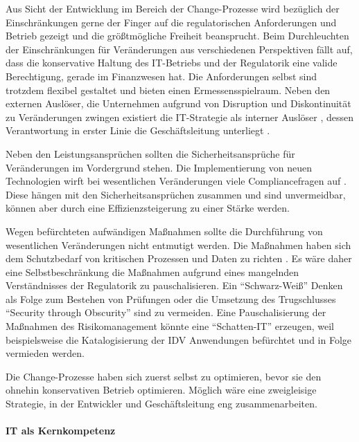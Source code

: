 Aus Sicht der Entwicklung im Bereich der Change-Prozesse wird bezüglich der Einschränkungen gerne der Finger auf die regulatorischen Anforderungen und Betrieb gezeigt und die größtmögliche Freiheit beansprucht. Beim Durchleuchten der Einschränkungen für Veränderungen aus verschiedenen Perspektiven fällt auf, dass die konservative Haltung des IT-Betriebs und der Regulatorik eine valide Berechtigung, gerade im Finanzwesen hat. Die Anforderungen selbst sind trotzdem flexibel gestaltet und bieten einen Ermessensspielraum. Neben den externen Auslöser, die Unternehmen aufgrund von Disruption und Diskontinuität zu Veränderungen zwingen \cite{Gupta:2017, Fernandez:2020} existiert die IT-Strategie als interner Auslöser \cite{BAIT:2018, Alt2017}, dessen Verantwortung in erster Linie die Geschäftsleitung unterliegt \cite{BAIT:2018}.

Neben den Leistungsansprüchen sollten die Sicherheitsansprüche für Veränderungen im Vordergrund stehen. Die Implementierung von neuen Technologien wirft bei wesentlichen Veränderungen viele Compliancefragen auf \cite{MaRisk:2017}. Diese hängen mit den Sicherheitsansprüchen zusammen und sind unvermeidbar, können aber durch eine Effizienzsteigerung zu einer Stärke werden.

Wegen befürchteten aufwändigen Maßnahmen sollte die Durchführung von wesentlichen Veränderungen nicht entmutigt werden. Die Maßnahmen haben sich dem Schutzbedarf von kritischen Prozessen und Daten zu richten \cite{MaRisk:2017, BAIT:2018}. Es wäre daher eine Selbstbeschränkung die Maßnahmen aufgrund eines mangelnden Verständnisses der Regulatorik zu pauschalisieren. Ein \enquote{Schwarz-Weiß} Denken als Folge zum Bestehen von Prüfungen oder die Umsetzung des Trugschlusses \enquote{Security through Obscurity} sind zu vermeiden. Eine Pauschalisierung der Maßnahmen des Risikomanagement könnte eine \enquote{Schatten-IT} \cite[S. 104]{Dorschel2018} erzeugen, weil beispielsweise die Katalogisierung der \ac{IDV} Anwendungen \cite{BAIT:2018} befürchtet und in Folge vermieden werden.

Die Change-Prozesse haben sich zuerst selbst zu optimieren, bevor sie den ohnehin konservativen Betrieb optimieren. Möglich wäre eine zweigleisige Strategie, in der Entwickler und Geschäftsleitung eng zusammenarbeiten.

\paragraph{IT als Kernkompetenz} 

